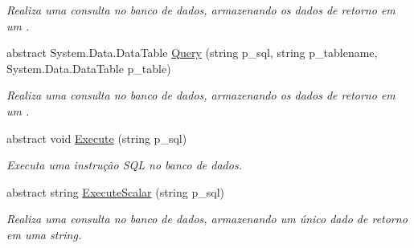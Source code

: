 \begin{DoxyCompactItemize}
\begin{DoxyCompactList}\small\item\em Realiza uma consulta no banco de dados, armazenando os dados de retorno em um . \end{DoxyCompactList}\item 
abstract System.\+Data.\+Data\+Table \hyperlink{classSpartacus_1_1Database_1_1Generic_a434ce0b27dfa73d909bc79c0b8471e54}{Query} (string p\+\_\+sql, string p\+\_\+tablename, System.\+Data.\+Data\+Table p\+\_\+table)
\begin{DoxyCompactList}\small\item\em Realiza uma consulta no banco de dados, armazenando os dados de retorno em um . \end{DoxyCompactList}\item 
abstract void \hyperlink{classSpartacus_1_1Database_1_1Generic_a28f1c8821906653eb4ff1484de893d16}{Execute} (string p\+\_\+sql)
\begin{DoxyCompactList}\small\item\em Executa uma instrução S\+Q\+L no banco de dados. \end{DoxyCompactList}\item 
abstract string \hyperlink{classSpartacus_1_1Database_1_1Generic_a983620fd71f520deb71ae55304b98bf6}{Execute\+Scalar} (string p\+\_\+sql)
\begin{DoxyCompactList}\small\item\em Realiza uma consulta no banco de dados, armazenando um único dado de retorno em uma string. \end{DoxyCompactList}\end{DoxyCompactItemize}
